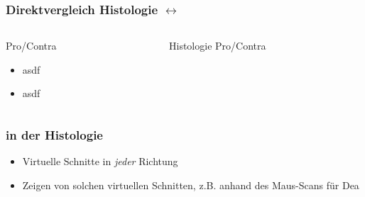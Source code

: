 \begin{frame}
	\frametitle{Direktvergleich Histologie \(\leftrightarrow\) \uct}
	\begin{columns}
			\begin{column}{0.49\linewidth}
				\centering
				\uct Pro/Contra
 				{\color{ubRed}\begin{itemize}
 					\item asdf
 					\item asdf
 				\end{itemize}}
 			\end{column}
 			\begin{column}{0.49\linewidth}
				\centering
 				Histologie Pro/Contra
 			\end{column}
	\end{columns}
\end{frame}

 \begin{frame}
 	\frametitle{\uct in der Histologie}
 	\begin{itemize}
 		\item Virtuelle Schnitte in \emph{jeder} Richtung
 		\item Zeigen von solchen virtuellen Schnitten, z.B. anhand des Maus-Scans für Dea
 	\end{itemize}
 \end{frame}


